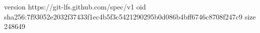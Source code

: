 version https://git-lfs.github.com/spec/v1
oid sha256:7f93052e2032f37433f1ec4b5f3c5421290295b0d086b4bff6746c8708f247c9
size 248649
